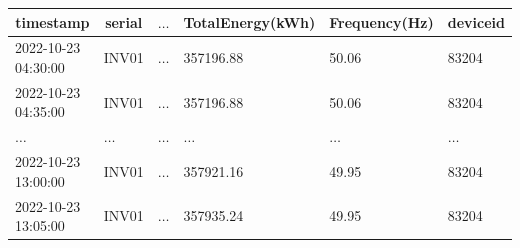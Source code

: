 \begin{table}[H]
	\begin{center}
		\begin{tabular}[c]{l|l|l|l|l|l}
			\hline
			\multicolumn{1}{c|}{\textbf{timestamp}}        &
			\multicolumn{1}{c|}{\textbf{serial}}           &
			\multicolumn{1}{c|}{\textbf{$\ldots$}}         &
			\multicolumn{1}{c|}{\textbf{TotalEnergy(kWh)}} &
			\multicolumn{1}{c|}{\textbf{Frequency(Hz)}}    &
			\multicolumn{1}{c}{\textbf{deviceid}}            \\
			\hline
			2022-10-23 04:30:00                            &
			INV01                                          &
			$\ldots$                                       &
			357196.88                                      &
			50.06                                          &
			83204                                            \\

			2022-10-23 04:35:00                            &
			INV01                                          &
			$\ldots$                                       &
			357196.88                                      &
			50.06                                          &
			83204                                            \\


			$\ldots$                                       &
			$\ldots$                                       &
			$\ldots$                                       &
			$\ldots$                                       &
			$\ldots$                                       &
			$\ldots$                                         \\
			2022-10-23 13:00:00                            &
			INV01                                          &
			$\ldots$                                       &
			357921.16                                      &
			49.95                                          &
			83204                                            \\
			2022-10-23 13:05:00                            &
			INV01                                          &
			$\ldots$                                       &
			357935.24                                      &
			49.95                                          &
			83204                                            \\


\end{tabular}
\end{center}
\end{table}
